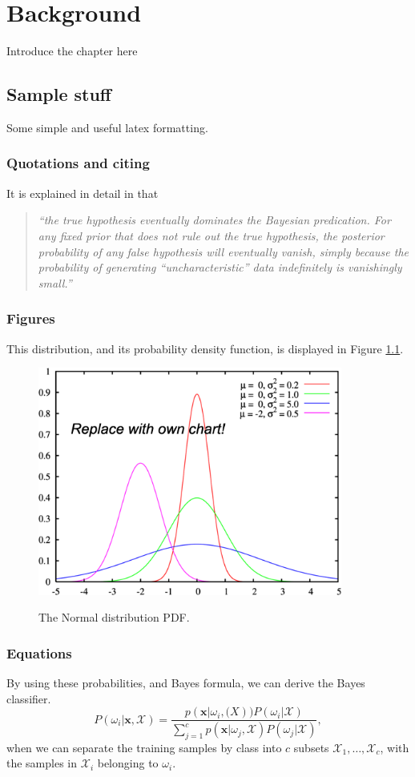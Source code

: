 \chapter{Background}
\label{ch:background}

Introduce the chapter here

\section{Sample stuff}
Some simple and useful latex formatting.

\subsection{Quotations and citing}
It is explained in detail in \cite[Ch.20]{Norvig03} that 
\begin{quotation}
\noindent \textit{``the true hypothesis eventually dominates the Bayesian predication. For any fixed prior that does not rule out the true hypothesis, the posterior probability of any false hypothesis will eventually vanish, simply because the probability of generating ``uncharacteristic'' data indefinitely is vanishingly small.''}
\end{quotation}
\subsection{Figures}
This distribution, and its probability density function, is displayed in Figure \ref{fig:gaussian_distr_pdf}.
\begin{figure}[ht]
	\center\includegraphics[width=10cm]{images/normal_distr_pdf}	
	\label{fig:gaussian_distr_pdf}
	\caption{The Normal distribution PDF.}
\end{figure}

\subsection{Equations}
By using these probabilities, and Bayes formula, we can derive the Bayes classifier.
\begin{equation}
	P(\omega_i | \boldsymbol{x}, \mathcal{X}) = \frac{p(\boldsymbol{x}|\omega_i, \mathcal(X))P(\omega_i|\mathcal{X})}{\sum_{j=1}^{c}p(\boldsymbol{x}|\omega_j, \mathcal{X})P(\omega_j|\mathcal{X})},
	\label{eq:bayes_formula_1}
\end{equation}
when we can separate the training samples by class into $c$ subsets $\mathcal{X}_1, \ldots, \mathcal{X}_c$, with the samples in $\mathcal{X}_i$ belonging to $\omega_i$.


